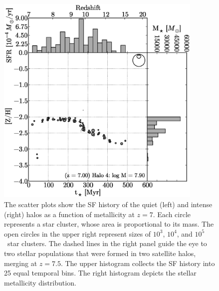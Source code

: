 \documentclass[12pt]{article}
\newcommand{\Ms}{\ifmmode{M_\odot}\else{$M_\odot$}\fi}
\begin{document}
\clearpage
\begin{figure}
\includegraphics[width=0.88\textwidth]{f4a.eps}
  \caption{\label{fig:pops} The scatter plots show the SF history of
    the quiet (left) and intense (right) halos as a function of
    metallicity at $z=7$.  Each circle represents a star cluster,
    whose area is proportional to its mass.  The open circles in the
    upper right represent sizes of $10^3$, $10^4$, and $10^5$ \Ms~star
    clusters.  The dashed lines in the right panel guide the eye to
    two stellar populations that were formed in two satellite halos,
    merging at $z=7.5$.  The upper histogram collects the SF history
    into 25 equal temporal bins.  The right histogram depicts the
    stellar metallicity distribution.}
\end{figure}


%
\end{document}
